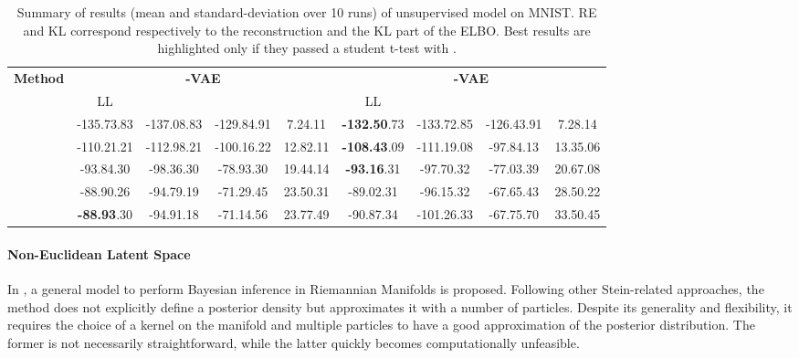 \documentclass[letterpaper]{article}
\begin{document}
 \begin{table*}[t]
  \centering
  \caption{Summary of results (mean and standard-deviation over 10 runs) of unsupervised model on MNIST. RE and KL correspond respectively to the reconstruction and the KL part of the ELBO. Best results are highlighted only if they passed a student t-test with .}
  \bigskip
  \begin{tabular}{l|cccc|cccc}
    \toprule
    \multirow{2}{*}{\textbf{Method}} &
        \multicolumn{4}{c}{\textbf{-VAE}} &
        \multicolumn{4}{c}{\textbf{-VAE}}
        \\
        & LL &  &  &  & LL &  &  &  \\
    \midrule
&-135.73{\tiny.83}&-137.08{\tiny.83}&-129.84{\tiny.91}&7.24{\tiny.11}&\textbf{-132.50}{\tiny.73}&-133.72{\tiny.85}&-126.43{\tiny.91}&7.28{\tiny.14}\\
&-110.21{\tiny.21}&-112.98{\tiny.21}&-100.16{\tiny.22}&12.82{\tiny.11}&\textbf{-108.43}{\tiny.09}&-111.19{\tiny.08}&-97.84{\tiny.13}&13.35{\tiny.06}\\
&-93.84{\tiny.30}&-98.36{\tiny.30}&-78.93{\tiny.30}&19.44{\tiny.14}&\textbf{-93.16}{\tiny.31}&-97.70{\tiny.32}&-77.03{\tiny.39}&20.67{\tiny.08}\\
&-88.90{\tiny.26}&-94.79{\tiny.19}&-71.29{\tiny.45}&23.50{\tiny.31}&-89.02{\tiny.31}&-96.15{\tiny.32}&-67.65{\tiny.43}&28.50{\tiny.22}\\
&\textbf{-88.93}{\tiny.30}&-94.91{\tiny.18}&-71.14{\tiny.56}&23.77{\tiny.49}&-90.87{\tiny.34}&-101.26{\tiny.33}&-67.75{\tiny.70}&33.50{\tiny.45}\\
    \bottomrule
  \end{tabular}
  \label{tab:mnist}
\end{table*}
 
\label{par:non-euclidean-latent-space}
\paragraph{Non-Euclidean Latent Space}
In \cite{riemann-stein}, a general model to perform Bayesian inference in Riemannian Manifolds is proposed. Following other Stein-related approaches, the method does not explicitly define a posterior density but approximates it with a number of particles. Despite its generality and flexibility, it requires the choice of a kernel on the manifold and multiple particles to have a good approximation of the posterior distribution. The former is not necessarily straightforward, while the latter quickly becomes computationally unfeasible. 
\end{document}
